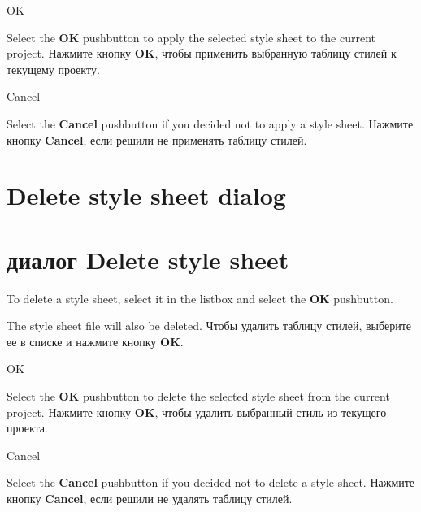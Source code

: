 \begin{popup}
\caption{OK}

\ifenglish
Select the {\bf OK} pushbutton to apply the selected style sheet to
the current project.
\else
Нажмите кнопку {\bf OK}, чтобы применить выбранную таблицу стилей к текущему
проекту.
\fi
\end{popup}

\begin{popup}
\caption{Cancel}

\ifenglish
Select the {\bf Cancel} pushbutton if you decided not to apply a style
sheet.
\else
Нажмите кнопку {\bf Cancel}, если решили не применять таблицу стилей.
\fi
\end{popup}

\ifenglish
\section{Delete style sheet dialog}
\else
\section{диалог Delete style sheet}
\fi
{}

\ifenglish
To delete a style sheet, select it in the
listbox and select the {\bf OK} pushbutton.

The style sheet file will also be deleted.
\else
Чтобы удалить таблицу стилей, выберите ее в списке 
и нажмите кнопку {\bf OK}.
\fi

\begin{popup}
\caption{OK}

\ifenglish
Select the {\bf OK} pushbutton to delete the selected style sheet from
the current project.
\else
Нажмите кнопку {\bf OK}, чтобы удалить выбранный стиль из
текущего проекта.
\fi
\end{popup}

\begin{popup}
\caption{Cancel}

\ifenglish
Select the {\bf Cancel} pushbutton if you decided not to delete a style
sheet.
\else
Нажмите кнопку {\bf Cancel}, если решили не удалять таблицу стилей.
\fi
\end{popup}

